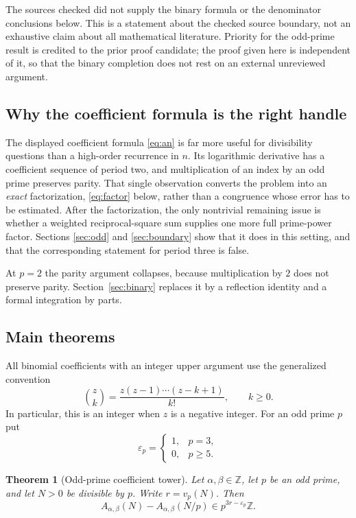\documentclass[11pt,a4paper]{article}
\numberwithin{equation}{section}
\newtheorem{theorem}{Theorem}[section]
\theoremstyle{definition}
\theoremstyle{remark}
\newcommand{\Z}{\mathbb Z}
\newcommand{\eps}{\varepsilon}
\newcommand{\A}{A_{\alpha,\beta}}
\begin{document}
The sources checked did not supply the binary formula or the denominator
conclusions below. This is a statement about the checked source boundary,
not an exhaustive claim about all mathematical literature. Priority for the
odd-prime result is credited to the prior proof candidate; the proof given
here is independent of it, so that the binary completion does not rest on an
external unreviewed argument.

\subsection{Why the coefficient formula is the right handle}
The displayed coefficient formula \eqref{eq:an} is far more useful for
divisibility questions than a high-order recurrence in $n$. Its logarithmic
derivative has a coefficient sequence of period two, and multiplication of
an index by an odd prime preserves parity. That single observation converts
the problem into an \emph{exact} factorization, \eqref{eq:factor} below,
rather than a congruence whose error has to be estimated. After the
factorization, the only nontrivial remaining issue is whether a weighted
reciprocal-square sum supplies one more full prime-power factor. Sections
\ref{sec:odd} and \ref{sec:boundary} show that it does in this setting, and
that the corresponding statement for period three is false.

At $p=2$ the parity argument collapses, because multiplication by $2$ does
not preserve parity. Section~\ref{sec:binary} replaces it by a reflection
identity and a formal integration by parts.

\subsection{Main theorems}
All binomial coefficients with an integer upper argument use the generalized
convention
\begin{equation}\label{eq:genbinomial}
 \binom{z}{k}=\frac{z(z-1)\cdots(z-k+1)}{k!},\qquad k\ge0.
\end{equation}
In particular, this is an integer when $z$ is a negative integer.
For an odd prime $p$ put
\begin{equation}\label{eq:epsilon}
 \eps_p=\begin{cases}1,&p=3,\\0,&p\ge5.\end{cases}
\end{equation}

\begin{theorem}[Odd-prime coefficient tower]\label{thm:odd}
Let $\alpha,\beta\in\Z$, let $p$ be an odd prime, and let $N>0$ be divisible
by $p$. Write $r=v_p(N)$. Then
\begin{equation}\label{eq:odd-tower}
 \A(N)-\A(N/p)\in p^{3r-\eps_p}\Z.
\end{equation}
\end{theorem}
\end{document}
